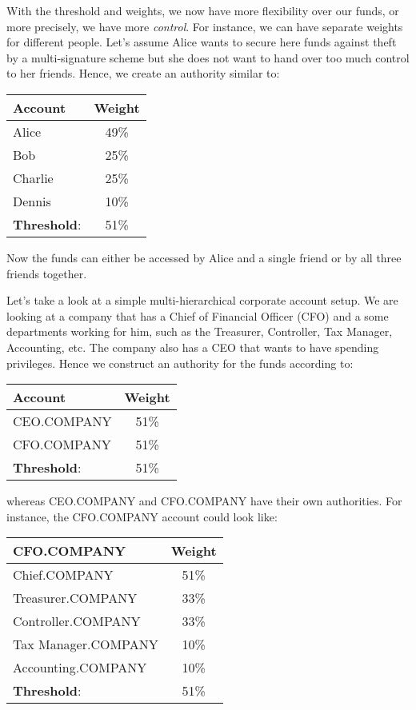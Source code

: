 With the threshold and weights, we now have more flexibility over our funds, or
more precisely, we have more \emph{control}. For instance, we can have separate
weights for different people. Let's assume Alice wants to secure here funds
against theft by a multi-signature scheme but she does not want to hand over too
much control to her friends. Hence, we create an authority similar to:

\begin{center}
 \begin{tabular}{l|c}
  \hline
  Account             & Weight\\\hline\hline
  Alice               & 49\%\\
  Bob                 & 25\%\\
  Charlie             & 25\%\\
  Dennis              & 10\%\\\hline\hline
  \textbf{Threshold}: & 51\%\\
  \hline
 \end{tabular}
\end{center}

Now the funds can either be accessed by Alice and a single friend or by all
three friends together.

Let's take a look at a simple multi-hierarchical corporate account setup.  We
are looking at a company that has a Chief of Financial Officer (CFO) and a some
departments working for him, such as the Treasurer, Controller, Tax Manager,
Accounting, etc. The company also has a CEO that wants to have spending
privileges. Hence we construct an authority for the funds according to:

\begin{center}
 \begin{tabular}{l|c}
  \hline
  Account               & Weight\\\hline
  CEO.COMPANY           & 51\%\\
  CFO.COMPANY           & 51\%\\\hline
  \textbf{Threshold}:   & 51\%\\
  \hline
 \end{tabular}
\end{center}

whereas CEO.COMPANY and CFO.COMPANY have their own authorities. For instance,
the CFO.COMPANY account could look like:

\begin{center}
 \begin{tabular}{l|c}
  \hline
   CFO.COMPANY             & Weight\\\hline
   Chief.COMPANY           & 51\%  \\
   Treasurer.COMPANY       & 33\%  \\
   Controller.COMPANY      & 33\%  \\
   Tax Manager.COMPANY     & 10\%  \\
   Accounting.COMPANY      & 10\%  \\\hline
   \textbf{Threshold}:     & 51\%  \\
  \hline
 \end{tabular}
\end{center}

